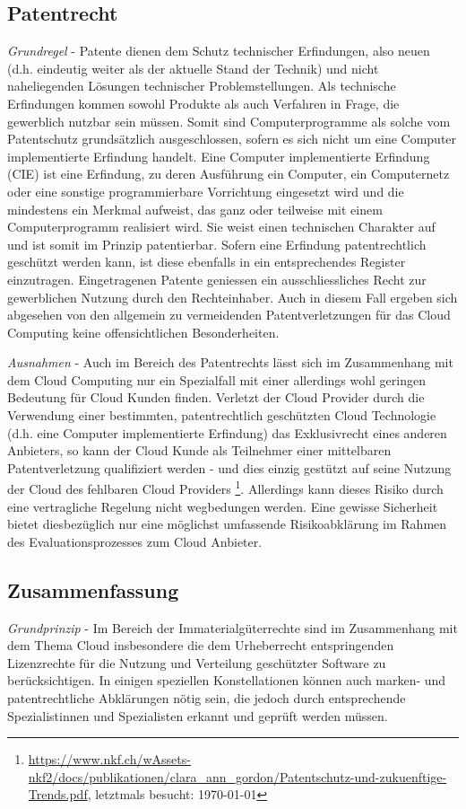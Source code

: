 \documentclass[a4paper,pointlessnumbers]{scrreprt}
\begin{document}
\subsection{Patentrecht}
\textit{Grundregel} - Patente dienen dem Schutz technischer Erfindungen, also neuen (d.h. eindeutig weiter als der aktuelle Stand der Technik) und nicht naheliegenden Lösungen technischer Problemstellungen. Als technische Erfindungen kommen sowohl Produkte als auch Verfahren in Frage, die gewerblich nutzbar sein müssen. Somit sind Computerprogramme als solche vom Patentschutz grundsätzlich ausgeschlossen, sofern es sich nicht um eine Computer implementierte Erfindung handelt. Eine Computer implementierte Erfindung (CIE) ist eine Erfindung, zu deren Ausführung ein Computer, ein Computernetz oder eine sonstige programmierbare Vorrichtung eingesetzt wird und die mindestens ein Merkmal aufweist, das ganz oder teilweise mit einem Computerprogramm realisiert wird. Sie weist einen technischen Charakter auf und ist somit im Prinzip patentierbar. Sofern eine Erfindung patentrechtlich geschützt werden kann, ist diese ebenfalls in ein entsprechendes Register einzutragen. Eingetragenen Patente geniessen ein ausschliessliches Recht zur gewerblichen Nutzung durch den Rechteinhaber. Auch in diesem Fall ergeben sich abgesehen von den allgemein zu vermeidenden Patentverletzungen für das Cloud Computing keine offensichtlichen Besonderheiten.

\textit{Ausnahmen} - Auch im Bereich des Patentrechts lässt sich im Zusammenhang mit dem Cloud Computing nur ein Spezialfall mit einer allerdings wohl geringen Bedeutung für Cloud Kunden finden. Verletzt der Cloud Provider durch die Verwendung einer bestimmten, patentrechtlich geschützten Cloud Technologie (d.h. eine Computer implementierte Erfindung) das Exklusivrecht eines anderen Anbieters, so kann der Cloud Kunde als Teilnehmer einer mittelbaren Patentverletzung qualifiziert werden - und dies einzig gestützt auf seine Nutzung der Cloud des fehlbaren Cloud Providers \footnote{\href{https://www.nkf.ch/wAssets-nkf2/docs/publikationen/clara\_ann\_gordon/Patentschutz-und-zukuenftige-Trends.pdf}{https://www.nkf.ch/wAssets-nkf2/docs/publikationen/clara\_ann\_gordon/Patentschutz-und-zukuenftige-Trends.pdf}, letztmals besucht: \today}. Allerdings kann dieses Risiko durch eine vertragliche Regelung nicht wegbedungen werden. Eine gewisse Sicherheit bietet diesbezüglich nur eine möglichst umfassende Risikoabklärung im Rahmen des Evaluationsprozesses zum Cloud Anbieter.

\subsection{Zusammenfassung}
\textit{Grundprinzip} - Im Bereich der Immaterialgüterrechte sind im Zusammenhang mit dem Thema Cloud insbesondere die dem Urheberrecht entspringenden Lizenzrechte für die Nutzung und Verteilung geschützter Software zu berücksichtigen. In einigen speziellen Konstellationen können auch marken- und patentrechtliche Abklärungen nötig sein, die jedoch durch entsprechende Spezialistinnen und Spezialisten erkannt und geprüft werden müssen.
\end{document}
